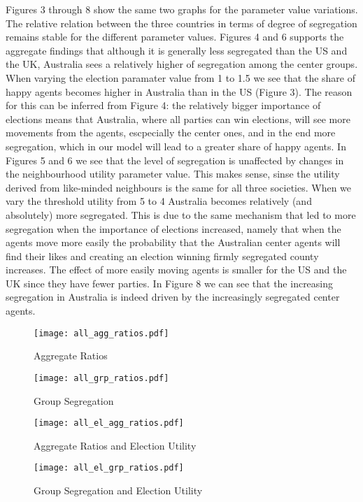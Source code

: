\documentclass[12pt, a4paper]{article}
\begin{document}
Figures 3 through 8 show the same two graphs for the parameter value variations. The relative relation between the three countries in terms of degree of segregation remains stable for the different parameter values. Figures 4 and 6 supports the aggregate findings that although it is generally less segregated than the US and the UK, Australia sees a relatively higher of segregation among the center groups. When varying the election paramater value from 1 to 1.5 we see that the share of happy agents becomes higher in Australia than in the US (Figure 3). The reason for this can be inferred from Figure 4: the relatively bigger importance of elections means that Australia, where all parties can win elections, will see more movements from the agents, escpecially the center ones, and in the end more segregation, which in our model will lead to a greater share of happy agents. In Figures 5 and 6 we see that the level of segregation is unaffected by changes in the neighbourhood utility parameter value. This makes sense, sinse the utility derived from like-minded neighbours is the same for all three societies. When we vary the threshold utility from 5 to 4 Australia becomes relatively (and absolutely) more segregated. This is due to the same mechanism that led to more segregation when the importance of elections increased, namely that when the agents move more easily the probability that the Australian center agents will find their likes and creating an election winning firmly segregated county increases. The effect of more easily moving agents is smaller for the US and the UK since they have fewer parties. In Figure 8 we can see that the increasing segregation in Australia is indeed driven by the increasingly segregated center agents.        

\begin{figure}[bp!]
\centering
\caption{Aggregate Ratios}
\texttt{[image: all\_agg\_ratios.pdf]}
\end{figure}

\begin{figure}[bp!]
\centering
\caption{Group Segregation}
\texttt{[image: all\_grp\_ratios.pdf]}
\end{figure}

\begin{figure}[bp!]
\centering
\caption{Aggregate Ratios and Election Utility}
\texttt{[image: all\_el\_agg\_ratios.pdf]}
\end{figure}

\begin{figure}[bp!]
\centering
\caption{Group Segregation and Election Utility}
\texttt{[image: all\_el\_grp\_ratios.pdf]}
\end{figure}
\end{document}
